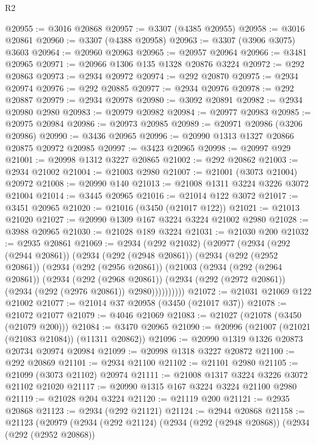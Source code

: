 \begin{lexlean}{R2}
\begin{coremodule}
@20955 := @3016 @20868
@20957 := @3307 (@4385 @20955)
@20958 := @3016 @20861
@20960 := @3307 (@4388 @20958)
@20963 := @3307 (@3906 @3075) @3603
@20964 := @20960 @20963
@20965 := @20957 @20964
@20966 := @3481 @20965
@20971 := @20966 @1306 @135 @1328 @20876 @3224
@20972 := @292 @20863
@20973 := @2934 @20972
@20974 := @292 @20870
@20975 := @2934 @20974
@20976 := @292 @20885
@20977 := @2934 @20976
@20978 := @292 @20887
@20979 := @2934 @20978
@20980 := @3092 @20891
@20982 := @2934 @20980 @2980
@20983 := @20979 @20982
@20984 := @20977 @20983
@20985 := @20975 @20984
@20986 := @20973 @20985
@20989 := @20971 @20986 (@3206 @20986)
@20990 := @3436 @20965
@20996 := @20990 @1313 @1327 @20866 @20875 @20972 @20985
@20997 := @3423 @20965
@20998 := @20997 @929
@21001 := @20998 @1312 @3227 @20865
@21002 := @292 @20862
@21003 := @2934 @21002
@21004 := @21003 @2980
@21007 := @21001 (@3073 @21004) @20972
@21008 := @20990 @140
@21013 := @21008 @1311 @3224 @3226 @3072 @21004
@21014 := @3445 @20965
@21016 := @21014 @122 @3072
@21017 := @3451 @20965
@21020 := @21016 (@3450 (@21017 @122))
@21021 := @21013 @21020
@21027 := @20990 @1309 @167 @3224 @3224 @21002 @2980
@21028 := @3988 @20965
@21030 := @21028 @189 @3224
@21031 := @21030 @200
@21032 := @2935 @20861
@21069 := @2934
    (@292 @21032)
    (@20977
      (@2934
        (@292 (@2944 @20861))
        (@2934
          (@292 (@2948 @20861))
          (@2934
            (@292 (@2952 @20861))
            (@2934
              (@292 (@2956 @20861))
              (@21003
                (@2934
                  (@292 (@2964 @20861))
                  (@2934
                    (@292 (@2968 @20861))
                    (@2934 (@292 (@2972 @20861)) (@2934 (@292 (@2976 @20861)) @2980))))))))))
@21072 := @21031 @21069 @122 @21002
@21077 := @21014 @37 @20958 (@3450 (@21017 @37))
@21078 := @21072 @21077
@21079 := @4046 @21069
@21083 := @21027 (@21078 (@3450 (@21079 @200)))
@21084 := @3470 @20965
@21090 := @20996 (@21007 (@21021 (@21083 @21084)) (@11311 @20862))
@21096 := @20990 @1319 @1326 @20873 @20734 @20974 @20984
@21099 := @20998 @1318 @3227 @20872
@21100 := @292 @20869
@21101 := @2934 @21100
@21102 := @21101 @2980
@21105 := @21099 (@3073 @21102) @20974
@21111 := @21008 @1317 @3224 @3226 @3072 @21102 @21020
@21117 := @20990 @1315 @167 @3224 @3224 @21100 @2980
@21119 := @21028 @204 @3224
@21120 := @21119 @200
@21121 := @2935 @20868
@21123 := @2934 (@292 @21121)
@21124 := @2944 @20868
@21158 := @21123
    (@20979
      (@2934
        (@292 @21124)
        (@2934
          (@292 (@2948 @20868))
          (@2934
            (@292 (@2952 @20868))

\end{coremodule}
\end{lexlean}

